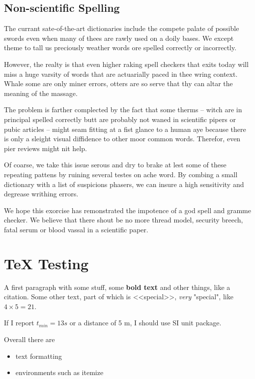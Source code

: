 \documentclass{scrartcl}
\begin{document}
\subsection{Non-scientific Spelling}

The currant sate-of-the-art dictionaries include the compete palate of 
possible swords even when many of thees are rawly used on a doily bases.  
We except theme to tall us preciously weather words ore spelled correctly 
or incorrectly. 

However, the realty is that even higher raking spell checkers that 
exits today will miss a huge varsity of words that are actuarially 
paced in thee wring context. Whale some are only miner errors, otters 
are so serve that thy can altar the meaning of the massage.

The problem is farther complected by the fact that some therms –
witch are in principal spelled correctly butt are probably not waned in 
scientific pipers or pubic articles – might seam fitting at a fist glance
to a human aye because there is only a sleight visual diffidence to 
other moor common words. Therefor, even pier reviews might nit help.

Of coarse, we take this issue serous and dry to brake at lest some of 
these repeating pattens by ruining several testes on ache word.
By combing a small dictionary with a list of suspicions phasers, 
we can insure a high sensitivity and degrease writhing errors.

We hope this exorcise has remonstrated the impotence of a god spell 
and gramme checker. We believe that there shout be no more thread model, 
security breech, fatal serum or blood vassal in a scientific paper.






\section{TeX Testing}\label{sec:texsection}
A first paragraph with some stuff, some \textbf{bold text}   and other things, like a citation\cite{my:paper}.
Some other text, part of which is <<special>>, \emph{very} "special", like $4 \times 5 = 21$.

If I report $t_{min} = 13s$ or a distance of 5 m, I should use SI unit package.


Overall there are 
\begin{itemize}
	\item text formatting
	\item environments such as itemize
\end{itemize}
\end{document}
